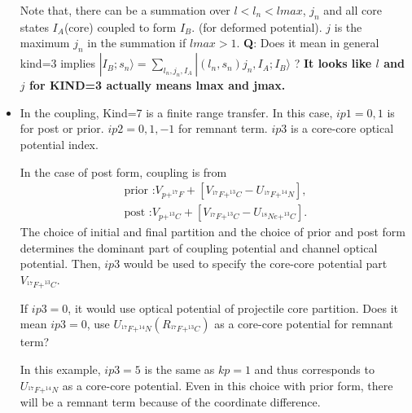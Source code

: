 \documentclass[11pt]{book}
\def\ra{\rangle}
\newcommand{\bea}{\begin{eqnarray}}
\newcommand{\eea}{\end{eqnarray}}
\newcommand{\no}{\nonumber \\}
\begin{document}
\begin{itemize}
    Note that, there can be a summation over 
    $l<l_n<lmax$, $j_n$ and all core states $I_A$(core) coupled to form $I_B$.
    (for deformed potential). $j$ is the maximum $j_n$ in the summation
    if $lmax>1$.  
    {\bf Q}: Does it mean in general kind=3 implies
    $|I_B; s_n\ra = \sum_{l_n,j_n,I_A} |(l_n,s_n)j_n,I_A;I_B\ra   $ ? 
    {\bf It looks like $l$ and $j$ for KIND=3 actually means lmax and jmax.}


\item In the coupling, Kind=7 is a finite range transfer. In this case,
      $ip1=0,1$ is for post or prior. 
      $ip2=0,1,-1$ for remnant term.
      $ip3$ is a core-core optical potential index. 
      
      In the case of post form, coupling is from 
      \bea
        \mbox{prior :} V_{p+^{17}F}+[V_{^{17}F+^{13}C}-U_{^{17}F+^{14}N}], \no  
        \mbox{post  :} V_{p+^{13}C}+[V_{^{17}F+^{13}C}-U_{^{18}Ne+^{13}C}].
      \eea 
      The choice of initial and final partition and the choice of prior and post form
      determines the dominant part of coupling potential and channel optical potential. 
      Then, $ip3$ would be used to specify the core-core potential part $V_{^{17}F+^{13}C}$. 
      
      If $ip3=0$, it would use optical potential of projectile core partition. 
      Does it mean $ip3=0$, use $U_{^{17}F+^{14}N}(R_{^{17}F+^{13}C})$ 
      as a core-core potential for remnant term? 
      
      In this example, $ip3=5$ is the same as $kp=1$ and thus corresponds to 
      $U_{^{17}F+^{14}N}$ as a core-core potential. Even in this choice with 
      prior form, there will be a remnant term because of the coordinate difference. 
       
\end{itemize}
\end{document}
